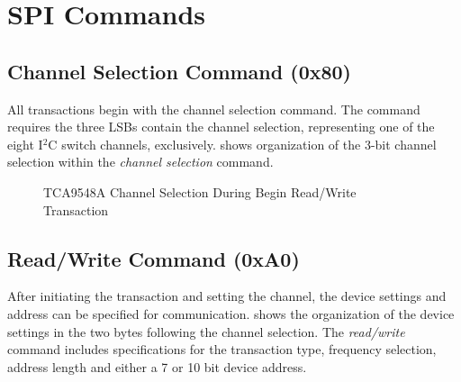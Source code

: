 \section{SPI Commands}

\subsection{Channel Selection Command (0x80)}

All transactions begin with the channel selection command. The command requires the three LSBs contain the channel selection, representing one of the eight I$^2$C switch channels, exclusively.  shows organization of the 3-bit channel selection within the \textit{channel selection} command. \\


\begin{figure}
	\caption{TCA9548A Channel Selection During Begin Read/Write Transaction}
	\label{fig:chselcommand}
\end{figure}



\subsection{Read/Write Command (0xA0)}

After initiating the transaction and setting the channel, the device settings and address can be specified for communication.  shows the organization of the device settings in the two bytes following the channel selection. The \textit{read/write} command includes specifications for the transaction type, frequency selection, address length and either a 7 or 10 bit device address.

